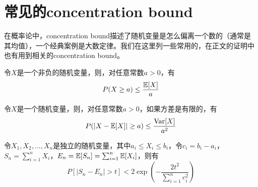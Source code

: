 
\thesisappendix

\chapter{常见的concentration bound}
在概率论中，concentration bound描述了随机变量是怎么偏离一个数的（通常是其均值），一个经典案例是大数定律。我们在这里列一些常用的，在正文的证明中也有用到相关的concentration bound。

\begin{theorem}
	令$X$是一个非负的随机变量，则，对任意常数$a>0$，有
	\begin{equation}
		P(X \geq a) \leq \frac{\mathbb{E}[X]}{a}
	\end{equation}
\end{theorem}

\begin{theorem}
	令$X$是一个随机变量，则，对任意常数$a>0$，如果方差是有限的，有
	\begin{equation}
		P(|X-\mathbb{E}[X]| \geq a) \leq \frac{\text{Var}[X]}{a^{2}}
	\end{equation}
\end{theorem}

\begin{theorem}
	令$X_1,X_2,...,X_n$是独立的随机变量，其中$a_i \leq X_i \leq b_i$，令$c_i = b_i - a_i$，$S_n = \sum_{i=1}^n X_i$，$E_n = \mathbb{E}[S_n] = \sum_{i=1}^n \mathbb{E}[X_i]$，则有
	\begin{equation}
		P\left[\left|S_{n}-E_{n}\right|>t\right]<2 \exp \left(-\frac{2 t^{2}}{\sum_{i=1}^{n} c_{i}^{2}}\right)
	\end{equation}
\end{theorem}